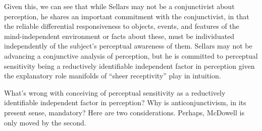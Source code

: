 \documentclass[12pt]{article}
\begin{document}

Given this, we can see that while Sellars may not be a conjunctivist about perception, he shares an important commitment with the conjunctivist, in that the reliable differential responsiveness to objects, events, and features of the mind-independent environment or facts about these, must be individuated independently of the subject's perceptual awareness of them. Sellars may not be advancing a conjunctive analysis of perception, but he is committed to perceptual sensitivity being a reductively identifiable independent factor in perception given the explanatory role manifolds of ``sheer receptivity'' play in intuition. 

What's wrong with conceiving of perceptual sensitivity as a reductively identifiable independent factor in perception? Why is anticonjunctivism, in its present sense, mandatory? Here are two considerations. Perhaps, McDowell is only moved by the second. 
\end{document}
